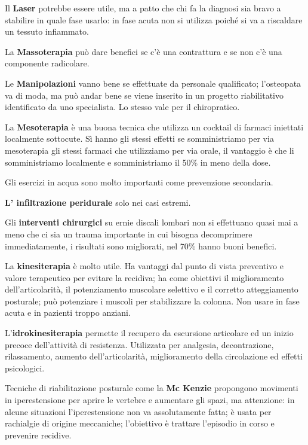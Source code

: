 Il \textbf{Laser} potrebbe essere utile, ma a patto che chi fa la
diagnosi sia bravo a stabilire in quale fase usarlo: in fase acuta non
si utilizza poiché si va a riscaldare un tessuto infiammato.

La \textbf{Massoterapia} può dare benefici se c'è una contrattura e se
non c'è una componente radicolare.

Le \textbf{Manipolazioni} vanno bene se effettuate da personale
qualificato; l'osteopata va di moda, ma può andar bene se viene inserito
in un progetto riabilitativo identificato da uno specialista. Lo stesso
vale per il chiropratico.

La \textbf{Mesoterapia} è una buona tecnica che utilizza un cocktail di
farmaci iniettati localmente sottocute. Sì hanno gli stessi effetti se
somministriamo per via mesoterapia gli stessi farmaci che utilizziamo
per via orale, il vantaggio è che li somministriamo localmente e
somministriamo il 50\% in meno della dose.

Gli esercizi in acqua sono molto importanti come prevenzione secondaria.

\textbf{L' infiltrazione peridurale} solo nei casi estremi.

Gli \textbf{interventi chirurgici} su ernie discali lombari non si
effettuano quasi mai a meno che ci sia un trauma importante in cui
bisogna decomprimere immediatamente, i risultati sono migliorati, nel
70\% hanno buoni benefici.

La \textbf{kinesiterapia} è molto utile. Ha vantaggi dal punto di vista
preventivo e valore terapeutico per evitare la recidiva; ha come
obiettivi il miglioramento dell'articolarità, il potenziamento muscolare
selettivo e il corretto atteggiamento posturale; può potenziare i
muscoli per stabilizzare la colonna. Non usare in fase acuta e in
pazienti troppo anziani.

L'\textbf{idrokinesiterapia} permette il recupero da escursione
articolare ed un inizio precoce dell'attività di resistenza. Utilizzata
per analgesia, decontrazione, rilassamento, aumento dell'articolarità,
miglioramento della circolazione ed effetti psicologici.

Tecniche di riabilitazione posturale come la \textbf{Mc Kenzie}
propongono movimenti in iperestensione per aprire le vertebre e
aumentare gli spazi, ma attenzione: in alcune situazioni
l'iperestensione non va assolutamente fatta; è usata per rachialgie di
origine meccaniche; l'obiettivo è trattare l'episodio in corso e
prevenire recidive.


